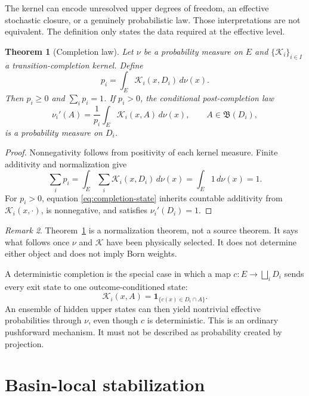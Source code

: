 \documentclass[11pt,a4paper]{article}
\newtheorem{theorem}{Theorem}[section]
\theoremstyle{definition}
\theoremstyle{remark}
\newtheorem{remark}[theorem]{Remark}
\newcommand{\cK}{\mathcal{K}}
\begin{document}
The kernel can encode unresolved upper degrees of freedom, an effective
stochastic closure, or a genuinely probabilistic law. Those interpretations
are not equivalent. The definition only states the data required at the
effective level.

\begin{theorem}[Completion law]
\label{thm:completion}
Let \(\nu\) be a probability measure on \(E\) and
\(\{\cK_i\}_{i\in I}\) a transition-completion kernel. Define
\begin{equation}
p_i=\int_E\cK_i(x,D_i)\,d\nu(x).
\label{eq:completion-prob}
\end{equation}
Then \(p_i\geq0\) and \(\sum_i p_i=1\). If \(p_i>0\), the conditional
post-completion law
\begin{equation}
\nu_i'(A)
=\frac{1}{p_i}\int_E\cK_i(x,A)\,d\nu(x),
\qquad A\in\mathfrak{B}(D_i),
\label{eq:completion-state}
\end{equation}
is a probability measure on \(D_i\).
\end{theorem}

\begin{proof}
Nonnegativity follows from positivity of each kernel measure. Finite
additivity and normalization give
\[
\sum_i p_i
=\int_E\sum_i\cK_i(x,D_i)\,d\nu(x)
=\int_E1\,d\nu(x)=1.
\]
For \(p_i>0\), equation \eqref{eq:completion-state} inherits countable
additivity from \(\cK_i(x,\cdot)\), is nonnegative, and satisfies
\(\nu_i'(D_i)=1\).
\end{proof}

\begin{remark}
Theorem~\ref{thm:completion} is a normalization theorem, not a source theorem.
It says what follows once \(\nu\) and \(\cK\) have been physically selected.
It does not determine either object and does not imply Born weights.
\end{remark}

A deterministic completion is the special case in which a map
\(c:E\to\bigsqcup_iD_i\) sends every exit state to one outcome-conditioned
state:
\[
\cK_i(x,A)
=\mathbf{1}_{\{c(x)\in D_i\cap A\}}.
\]
An ensemble of hidden upper states can then yield nontrivial effective
probabilities through \(\nu\), even though \(c\) is deterministic. This is an
ordinary pushforward mechanism. It must not be described as probability
created by projection.

\section{Basin-local stabilization}
\end{document}
